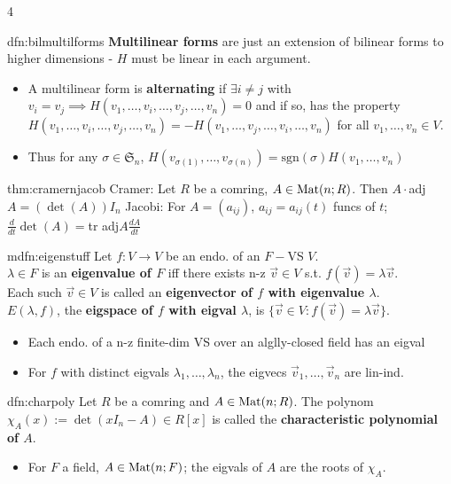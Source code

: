 \documentclass[landscape, 8pt]{extarticle}
\begin{document}
\begin{multicols*}{4}
\begin{dfn}{dfn:bilmultilforms}{ }
			\textbf{Multilinear forms} are just an extension of bilinear forms to higher dimensions - $H$ must be linear in each argument.
			\begin{itemize}
				\item A multilinear form is \textbf{alternating} if $\exists i \ne j$ with $v_i = v_j \implies H(v_1, \dots, v_i, \dots, v_j, \dots, v_n) = 0$ and if so, has the property $H(v_1, \dots, v_i, \dots, v_j, \dots, v_n) = -H(v_1, \dots, v_j, \dots, v_i, \dots, v_n)$ for all $v_1, \dots, v_n \in V$.
				\item Thus for any $\sigma \in \mathfrak{S}_n$, $H(v_{\sigma(1)}, \dots, v_{\sigma(n)}) =\text{sgn}(\sigma)H(v_1, \dots, v_n)$
			\end{itemize}
			
		\end{dfn}
		
		
		\begin{thm}{thm:cramernjacob}{ }
			Cramer: Let $R$ be a comring, $A \in \operatorname{Mat}(n; R)$. Then $A \cdot $adj$A = (\det(A)) I_n$
			Jacobi: For $A = (a_{ij})$, $a_{ij} = a_{ij}(t)$ funcs of $t$; $\frac{d}{dt}\det(A) = $tr adj$A \frac{dA}{dt}$
			
		\end{thm}
		
		
		\begin{mdfn}{mdfn:eigenstuff}{ }
			Let $f: V \to V$ be an endo. of an $F-$VS $V$. \\
			$\lambda \in F$ is an \textbf{eigenvalue of $F$} iff there exists n-z $\vec{v} \in V$ s.t. $f(\vec{v}) = \lambda \vec{v}$.\\
			Each such $\vec{v} \in V$ is called an \textbf{eigenvector of $f$ with eigenvalue $\lambda$}.\\
			$E(\lambda, f)$, the \textbf{eigspace of $f$ with eigval $\lambda$}, is $\{\vec{v} \in V : f(\vec{v}) = \lambda\vec{v}\}$.
			\begin{itemize}
				\item Each endo. of a n-z finite-dim VS over an alglly-closed field has an eigval
				\item For $f$ with distinct eigvals $\lambda_1, \dots, \lambda_n$, the eigvecs $\vec{v}_1, \dots, \vec{v}_n$ are lin-ind.
			\end{itemize}
			
		\end{mdfn}
		
		
		\begin{dfn}{dfn:charpoly}{ }
			Let $R$ be a comring and $A \in \operatorname{Mat}(n; R)$. The polynom $\chi_A(x) := \det(xI_n - A) \in R[x]$ is called the \textbf{characteristic polynomial of $A$}.
			\begin{itemize}
				\item For $F$ a field, $A \in \operatorname{Mat}(n; F)$; the eigvals of $A$ are the roots of $\chi_A$.
			\end{itemize}
			

\end{dfn}
\end{multicols*}
\end{document}
